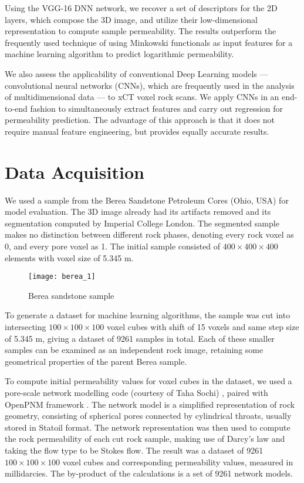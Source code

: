 \documentclass[review]{elsarticle}
\begin{document}
Using the VGG-16 DNN \cite{simonyan2014very} network, we recover a set of descriptors for the 2D layers, which compose the 3D image, and utilize their low-dimensional representation to compute sample permeability. The results outperform the frequently used technique of using Minkowski functionals as input features for a machine learning algorithm to predict logarithmic permeability.

We also assess the applicability of conventional Deep Learning models — convolutional neural networks (CNNs), which are frequently used in the analysis of multidimensional data — to \textmu xCT voxel rock scans. We apply CNNs in an end-to-end fashion to simultaneously extract features and carry out regression for permeability prediction. The advantage of this approach is that it does not require manual feature engineering, but provides equally accurate results.

\section{Data Acquisition}

We used a sample from the Berea Sandstone Petroleum Cores (Ohio, USA) for model evaluation. The 3D image already had its artifacts removed and its segmentation computed by Imperial College London. The segmented sample makes no distinction between different rock phases, denoting every rock voxel as 0, and every pore voxel as 1. The initial sample consisted of $400 \times 400 \times 400$ elements with voxel size of 5.345 \textmu m.

\begin{wrapfigure}{r}{0.5\textwidth}
    \centering  \texttt{[image: berea\_1]}
    \caption{Berea sandstone sample}
\end{wrapfigure}

To generate a dataset for machine learning algorithms, the sample was cut into intersecting $100 \times 100 \times 100$ voxel cubes with shift of 15 voxels and same step size of 5.345 \textmu m, giving a dataset of 9261 samples in total. Each of these smaller samples can be examined as an independent rock image, retaining some geometrical properties of the parent Berea sample.

To compute initial permeability values for voxel cubes in the dataset, we used a pore-scale network modelling code (courtesy of Taha Sochi) \cite{sochi2010pore}, paired with OpenPNM framework \cite{putz2013introducing}. The network model is a simplified representation of rock geometry, consisting of spherical pores connected by cylindrical throats, usually stored in Statoil format. The network representation was then used to compute the rock permeability of each cut rock sample, making use of Darcy’s law and taking the flow type to be Stokes flow. The result was a dataset of 9261 $100 \times 100 \times 100$ voxel cubes and corresponding permeability values, measured in millidarcies. The by-product of the calculations is a set of 9261 network models.
\end{document}
